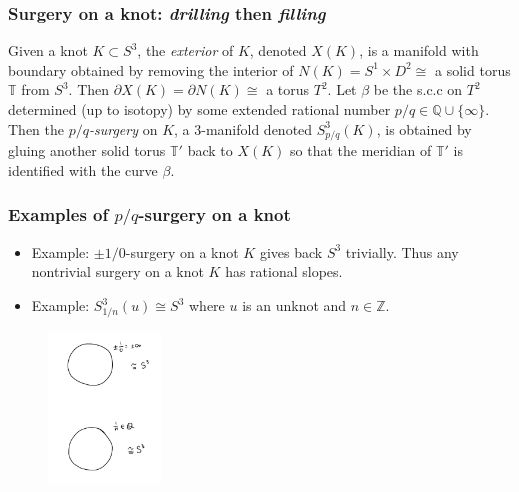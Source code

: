 \documentclass{beamer}
\theoremstyle{ex}
\theoremstyle{rem}
\begin{document}
	\begin{frame}
		\frametitle{Surgery on a knot: \textit{drilling} then \textit{filling}}
		\begin{definition}
		Given a knot $K \subset S^3$, the \textit{exterior} of $K$, denoted $X(K)$, is a manifold with boundary obtained by removing the interior of $N(K) = S^1 \times D^2 \cong$ a solid torus $\mathbb{T}$ from $S^3$. Then $\partial X(K) = \partial N(K) \cong$ a torus $T^2$. Let $\beta$ be the s.c.c on $T^2$ determined (up to isotopy) by some extended rational number $p/q \in \mathbb{Q}\cup\{\infty\}$. Then the \textit{$p/q$-surgery} on $K$, a $3$-manifold denoted $S^3_{p/q}(K)$, is obtained by gluing another solid torus $\mathbb{T'}$ back to $X(K)$ so that the meridian of $\mathbb{T'}$ is identified with the curve $\beta$. 
		\end{definition}
	\end{frame}

	\begin{frame}
	\frametitle{Examples of $p/q$-surgery on a knot}
		\begin{itemize}
		\item Example: $\pm 1/0$-surgery on a knot $K$ gives back $S^3$ trivially. Thus any nontrivial surgery on a knot $K$ has rational slopes.  			
		\end{itemize}
		\begin{itemize}
		\item Example: $S^3_{1/n}(u) \cong S^3$ where $u$ is an unknot and $n \in \mathbb{Z}$.
		\end{itemize}
		\begin{figure}
			\centering
			\includegraphics[width=30mm]{Unknot.jpg}
		\end{figure}	
	\end{frame}
\end{document}
